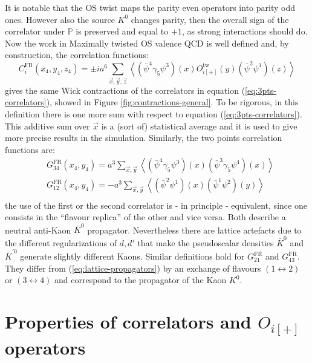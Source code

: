 \documentclass[english, LaM, oneside, noexaminfo]{sapthesis}
\newcommand{\la}{\langle}
\newcommand{\ra}{\rangle}
\begin{document}
It is notable that the OS twist maps the parity even operators into parity odd ones.
However also the source $K^{0}$ changes parity, then the overall sign of the correlator under $\mathbb{P}$ is preserved and equal to $+1$, as strong interactions should do.
Now the work in Maximally twisted OS valence QCD is well defined and, by construction, the correlation functions:
\begin{equation}\label{eq:lattice-correlators}
    C_i^\text{FR}(x_4,y_4,z_4) = \pm i a^6 \sum_{\vec x, \vec y, \vec z}\left\la \left(\bar\psi^4 \gamma_5 \psi^3 \right) (x) O_{i[+]}^\text{tw} (y) \left(\bar\psi^2 \psi^1 \right) (z)\right\ra
\end{equation}
gives the same Wick contractions of the correlators in equation (\ref{eq:3pts-correlators}), showed in Figure \ref{fig:contractions-general}.
To be rigorous, in this definition there is one more sum with respect to equation (\ref{eq:3pts-correlators}).
This additive sum over $\vec x$ is a (sort of) statistical average and it is used to give more precise results in the simulation.
Similarly, the two points correlation functions are:
\begin{equation}\label{eq:lattice-propagators}
    \begin{split}
        & G_{34}^\text{FR}(x_4,y_4) = a^3 \sum_{\vec x, \vec y} \left\la \left(\bar\psi^4 \gamma_5 \psi^3 \right) (x) \left(\bar\psi^3 \gamma_5 \psi^4 \right) (x) \right\ra \\
        & G_{12}^\text{FR}(x_4,y_4) = - a^3 \sum_{\vec x, \vec y} \left\la \left(\bar\psi^2 \psi^1 \right) (x) \left(\bar\psi^1 \psi^2 \right) (y) \right\ra \\
    \end{split}
\end{equation}
the use of the first or the second correlator is - in principle - equivalent, since one consists in the ``flavour replica'' of the other and vice versa.
Both describe a neutral anti-Kaon $\bar K^0$ propagator.
Nevertheless there are lattice artefacts due to the different regularizations of $d,d'$ that make the pseudoscalar densities $\bar K^0$ and $\bar K^{'0}$ generate slightly different Kaons.
\newline 
Similar definitions hold for $G_{21}^\text{FR}$ and $G_{43}^\text{FR}$.
They differ from (\ref{eq:lattice-propagators}) by an exchange of flavours $(1\leftrightarrow 2)$ or $(3\leftrightarrow 4)$ and correspond to the propagator of the Kaon $K^0$.

\section{Properties of correlators and $O_{i[+]}$ operators}\label{sec:operators-properties}
\end{document}
